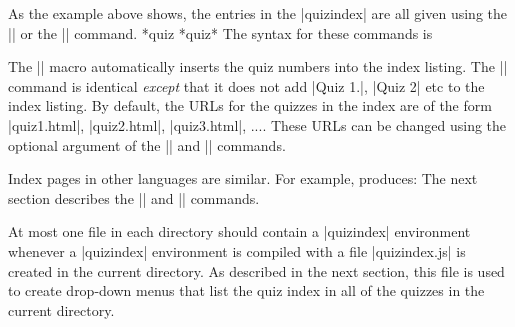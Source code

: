 \documentclass[svgnames]{article}
\begin{document}
    As the example above shows, the entries in the \LatexCode|quizindex| are all
    given using the \LatexCode|\quiz| or the \LatexCode|\quiz*| command.
    *{quiz}
    *{quiz*}
    The syntax for these commands is
    \begin{latexcode}
    \end{latexcode}
    The \LatexCode|\quiz| macro automatically inserts the quiz numbers
    into the index listing. The \LatexCode|\quiz*| command is identical
    \textit{except} that it does not add \BashCode|Quiz 1.|,
    \BashCode|Quiz 2| etc to the index listing. By default, the URLs for
    the quizzes in the index are of the form \BashCode|quiz1.html|,
    \BashCode|quiz2.html|, \BashCode|quiz3.html|, .... These URLs can be
    changed using the optional argument of the  \LatexCode|\quiz| and
    \LatexCode|\quiz*| commands.

    Index pages in other languages are similar. For example,
    produces:
    The next section describes the \LatexCode|\BreadCrumb| and
    \LatexCode|\BreadCrumbs| commands.

    At most one file in each directory should contain a
    \LatexCode|quizindex| environment whenever a
    \LatexCode|quizindex| environment is compiled with \WebQuiz a file
    \BashCode|quizindex.js| is created in the current directory. As
    described in the next section, this file is used to create drop-down
    menus that list the quiz index in all of the quizzes in the current
    directory.

    \filbreak
\end{document}
